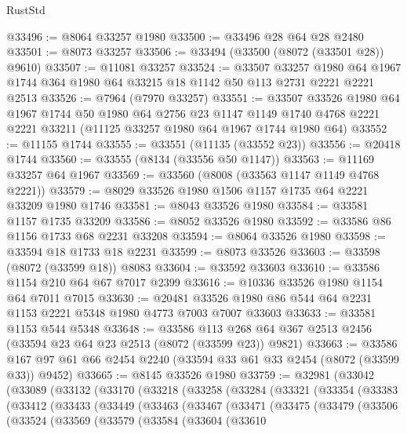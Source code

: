 \begin{lexlean}{RustStd}
\begin{coremodule}
@33496 := @8064 @33257 @1980
@33500 := @33496 @28 @64 @28 @2480
@33501 := @8073 @33257
@33506 := @33494 (@33500 (@8072 (@33501 @28)) @9610)
@33507 := @11081 @33257
@33524 := @33507
    @33257
    @1980
    @64
    @1967
    @1744
    @364
    @1980
    @64
    @33215
    @18
    @1142
    @50
    @113
    @2731
    @2221
    @2221
    @2513
@33526 := @7964 (@7970 @33257)
@33551 := @33507
    @33526
    @1980
    @64
    @1967
    @1744
    @50
    @1980
    @64
    @2756
    @23
    @1147
    @1149
    @1740
    @4768
    @2221
    @2221
    @33211
    (@11125 @33257 @1980 @64 @1967 @1744 @1980 @64)
@33552 := @11155 @1744
@33555 := @33551 (@11135 (@33552 @23))
@33556 := @20418 @1744
@33560 := @33555 (@8134 (@33556 @50 @1147))
@33563 := @11169 @33257 @64 @1967
@33569 := @33560 (@8008 (@33563 @1147 @1149 @4768 @2221))
@33579 := @8029 @33526 @1980 @1506 @1157 @1735 @64 @2221 @33209 @1980 @1746
@33581 := @8043 @33526 @1980
@33584 := @33581 @1157 @1735 @33209
@33586 := @8052 @33526 @1980
@33592 := @33586 @86 @1156 @1733 @68 @2231 @33208
@33594 := @8064 @33526 @1980
@33598 := @33594 @18 @1733 @18 @2231
@33599 := @8073 @33526
@33603 := @33598 (@8072 (@33599 @18)) @8083
@33604 := @33592 @33603
@33610 := @33586 @1154 @210 @64 @67 @7017 @2399
@33616 := @10336 @33526 @1980 @1154 @64 @7011 @7015
@33630 := @20481 @33526 @1980 @86 @544 @64 @2231 @1153 @2221 @5348 @1980 @4773 @7003 @7007 @33603
@33633 := @33581 @1153 @544 @5348
@33648 := @33586
    @113
    @268
    @64
    @367
    @2513
    @2456
    (@33594 @23 @64 @23 @2513 (@8072 (@33599 @23)) @9821)
@33663 := @33586 @167 @97 @61 @66 @2454 @2240 (@33594 @33 @61 @33 @2454 (@8072 (@33599 @33)) @9452)
@33665 := @8145 @33526 @1980
@33759 := @32981
    (@33042
      (@33089
        (@33132
          (@33170
            (@33218
              (@33258
                (@33284
                  (@33321
                    (@33354
                      (@33383
                        (@33412
                          (@33433
                            (@33449
                              (@33463
                                (@33467
                                  (@33471
                                    (@33475
                                      (@33479
                                        (@33506
                                          (@33524
                                            (@33569
                                              (@33579
                                                (@33584
                                                  (@33604
                                                    (@33610

\end{coremodule}
\end{lexlean}
